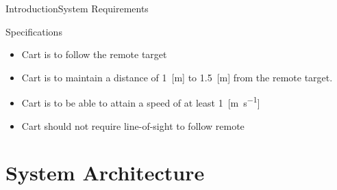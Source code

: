 \documentclass{beamer}
\begin{document}
\begin{frame}{Introduction}{System Requirements}
  \begin{block}{Specifications}
    \begin{itemize}
      \item Cart is to follow the remote target
      \item Cart is to maintain a distance of 1~[\si{\meter}] to 1.5~[\si{\meter}] from the remote target.
      \item Cart is to be able to attain a speed of at least 1~[\si{\meter\per\second}]
      \item Cart should not require line-of-sight to follow remote
     \end{itemize}
  \end{block}
\end{frame}



\section{System Architecture}
\end{document}
